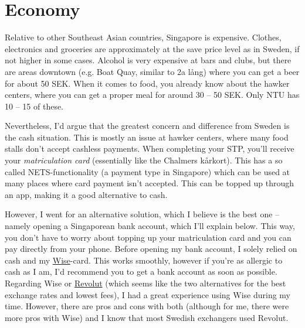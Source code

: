 \section*{Economy}
\label{eco}
Relative to other Southeast Asian countries, Singapore is expensive. Clothes, electronics and groceries are approximately at the save price level as in Sweden, if not higher in some cases. Alcohol is very expensive at bars and clubs, but there are areas downtown (e.g. Boat Quay, similar to 2a lång) where you can get a beer for about 50 SEK. When it comes to food, you already know about the hawker centers, where you can get a proper meal for around 30 -- 50 SEK. Only NTU has 10 -- 15 of these.

Nevertheless, I'd argue that the greatest concern and difference from Sweden is the cash situation. This is mostly an issue at hawker centers, where many food stalls don't accept cashless payments. When completing your STP, you'll receive your \textit{matriculation card} (essentially like the Chalmers kårkort). This has a so called NETS-functionality (a payment type in Singapore) which can be used at many places where card payment isn't accepted. This can be topped up through an app, making it a good alternative to cash. 

However, I went for an alternative solution, which I believe is the best one -- namely opening a Singaporean bank account, which I'll explain below. This way, you don't have to worry about topping up your matriculation card and you can pay directly from your phone. Before opening my bank account, I solely relied on cash and my \href{https://wise.com}{Wise}-card. This works smoothly, however if you're as allergic to cash as I am, I'd recommend you to get a bank account as soon as possible. Regarding Wise or \href{https://www.revolut.com/sv-SE/}{Revolut} (which seems like the two alternatives for the best exchange rates and lowest fees), I had a great experience using Wise during my time. However, there are pros and cons with both (although for me, there were more pros with Wise) and I know that most Swedish exchangers used Revolut.
